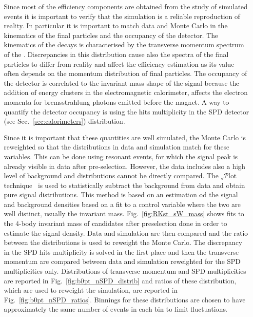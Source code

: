Since most of the efficiency components are obtained from the study of
simulated events it is important to verify that the simulation is a reliable
reproduction of reality. In particular it is important to match data and Monte Carlo
in the kinematics of the final particles and the occupancy of the detector.
The kinematics of the decays is characterised by the transverse momentum spectrum of
the \Bz. Discrepancies in this distribution cause also the spectra of the final particles
to differ from reality and affect the efficiency estimation as its value often
depends on the momentum distribution of final particles.
The occupancy of the detector is correlated to the invariant mass shape of the signal because
the addition of energy clusters in the electromagnetic calorimeter,
affects the electron momenta for bremsstrahlung photons emitted before the magnet.
A way to quantify the detector occupancy is using the hits multiplicity in the SPD
detector (see Sec.~\ref{sec:calorimeters}) distribution.

Since it is important that these quantities are well simulated, the Monte Carlo is
reweighted so that the distributions in data and simulation match for these variables.
This can be done using resonant \decay{\Bz}{\Kstar\jpsi} events, for which the signal peak
is already visible in data after pre-selection. However, the data includes also
a high level of background and distributions cannot be directly compared.
The $_s\mathcal{P}$lot technique~\cite{sPlot} is used to statistically subtract the background from
data and obtain pure signal distributions. This method is based on an estimation
od the signal and background densities based on a fit to a control variable where
the two are well distinct, usually the invariant mass. Fig.~\ref{fig:RKst_sW_mass} shows
fits to the 4-body invariant mass of candidates after preselection done in order to
estimate the signal density. Data and simulation are then compared 
and the ratio between the distributions is used to reweight the Monte Carlo. The discrepancy 
in the SPD hits multiplicity is solved in the first place and then the \Bz transverse momentum 
are compared between data and simulation reweighted for the SPD multiplicities only.
Distributions of \Bz transverse momentum and SPD multiplicities are reported in Fig.~\ref{fig:b0pt_nSPD_distrib}
and ratios of these distribution, which are used to reweight the simulation, are reported in 
Fig.~\ref{fig:b0pt_nSPD_ratios}. Binnings for these distributions are chosen to have approximately 
the same number of events in each bin to limit fluctuations.

